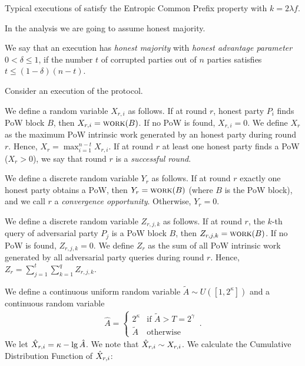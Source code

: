 \begin{conjecture}
  Typical executions of \poem satisfy the Entropic Common Prefix property
  with $k = 2 \lambda f$.
\end{conjecture}

In the analysis we are going to assume honest majority.

\begin{definition}
  We say that an execution has \emph{honest majority} with \emph{honest advantage parameter}
  $0 < \delta \leq 1$, if the number $t$ of corrupted parties out of
  $n$ parties satisfies $t \leq (1 - \delta) (n - t)$.
\end{definition}


Consider an execution of the \poem protocol.

We define a random variable $X_{r, i}$ as follows.
If at round $r$, honest party $P_i$ finds PoW block $B$, then $X_{r, i} = \textsc{work}(B)$.
If no PoW is found, $X_{r, i} = 0$. We define $X_{r}$ as the maximum PoW intrinsic work
generated by an honest party during round $r$. Hence, $X_{r} = \max_{i = 1}^{n - t}{X_{r,i}}$.
If at round $r$ at least one honest party finds a PoW ($X_r > 0$),
we say that round $r$ is a \emph{successful round}.

We define a discrete random variable $Y_r$ as follows.
If at round $r$ exactly one honest party obtains a PoW, then $Y_r = \textsc{work}(B)$ (where $B$
is the PoW block), and we call $r$ a \emph{convergence opportunity}.
Otherwise, $Y_r = 0$.

We define a discrete random variable $Z_{r, j, k}$ as follows.
If at round $r$, the $k$-th query of adversarial party $P_j$ is a PoW block $B$, then
$Z_{r, j, k} = \textsc{work}(B)$. If no PoW is found, $Z_{r, j, k} = 0$.
We define $Z_{r}$ as the sum of all PoW intrinsic work generated by all adversarial
party queries during round $r$. Hence, $Z_{r} = \sum_{j = 1}^{t}{ \sum_{k = 1}^{q}{ Z_{r, j, k} } }$.

We define a continuous uniform random variable $\tilde A \sim U([1, 2^\kappa])$ and
a continuous random variable
\begin{gather*}
  \hat A =
  \begin{cases}
    2^\kappa & \text{if } \tilde A > T = 2^\gamma \\
    \tilde A & \text{otherwise}
  \end{cases}\,.
\end{gather*}
We let $\hat X_{r, i} = \kappa - \lg \hat A$. We note that $\hat X_{r, i} \sim X_{r, i}$.
We calculate the Cumulative Distribution Function of $\hat X_{r, i}$:

